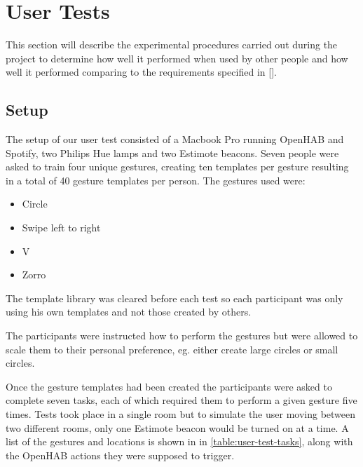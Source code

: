 \section{User Tests}
\label{sec:evaluation:user-tests}

This section will describe the experimental procedures carried out during the project to determine how well it performed when used by
other people and how well it performed comparing to the requirements specified in \cref{}.

\subsection{Setup}
\label{sec:evaluation:user-tests-setup}

The setup of our user test consisted of a Macbook Pro running OpenHAB and Spotify, two Philips Hue lamps and two Estimote beacons.
Seven people were asked to train four unique gestures, creating ten templates per gesture resulting in a total of 40 gesture templates
per person.
The gestures used were:

\begin{itemize}
  \item Circle
  \item Swipe left to right
  \item V
  \item Zorro
\end{itemize}

The template library was cleared before each test so each participant was only using his own templates and not those created by others.

The participants were instructed how to perform the gestures but were allowed to scale them to their personal preference, eg.
either create large circles or small circles.

Once the gesture templates had been created the participants were asked to complete seven tasks, each of which required them to perform a given gesture five times.
Tests took place in a single room but to simulate the user moving between two different rooms, only one Estimote beacon would be turned on at a time.
A list of the gestures and locations is shown in in \cref{table:user-test-tasks}, along with the OpenHAB actions they were supposed to trigger.

